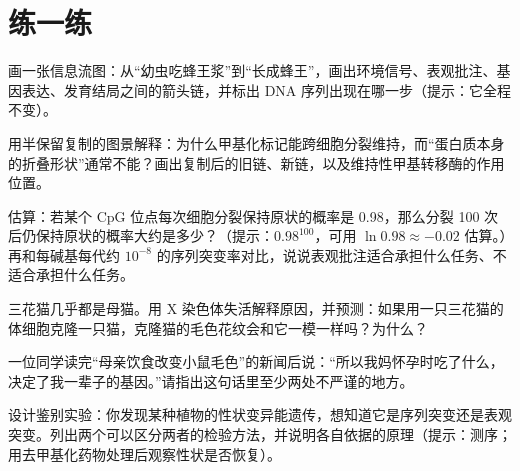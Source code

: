 \section*{练一练}

\begin{sikaoti}
\item 画一张信息流图：从“幼虫吃蜂王浆”到“长成蜂王”，画出环境信号、表观批注、基因表达、发育结局之间的箭头链，并标出 DNA 序列出现在哪一步（提示：它全程不变）。
\item 用半保留复制的图景解释：为什么甲基化标记能跨细胞分裂维持，而“蛋白质本身的折叠形状”通常不能？画出复制后的旧链、新链，以及维持性甲基转移酶的作用位置。
\item 估算：若某个 CpG 位点每次细胞分裂保持原状的概率是 0.98，那么分裂 100 次后仍保持原状的概率大约是多少？（提示：$0.98^{100}$，可用 $\ln 0.98\approx -0.02$ 估算。）再和每碱基每代约 $10^{-8}$ 的序列突变率对比，说说表观批注适合承担什么任务、不适合承担什么任务。
\item 三花猫几乎都是母猫。用 X 染色体失活解释原因，并预测：如果用一只三花猫的体细胞克隆一只猫，克隆猫的毛色花纹会和它一模一样吗？为什么？
\item 一位同学读完“母亲饮食改变小鼠毛色”的新闻后说：“所以我妈怀孕时吃了什么，决定了我一辈子的基因。”请指出这句话里至少两处不严谨的地方。
\item 设计鉴别实验：你发现某种植物的性状变异能遗传，想知道它是序列突变还是表观突变。列出两个可以区分两者的检验方法，并说明各自依据的原理（提示：测序；用去甲基化药物处理后观察性状是否恢复）。
\end{sikaoti}
